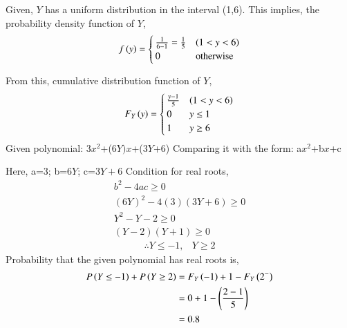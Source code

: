 Given, $Y$ has a uniform distribution in the interval (1,6).  
This implies, the probability density function of $Y$,
\begin{align}
f\brak{y} 
= 
\begin{cases}
\frac{1}{6-1} = \frac{1}{5}           & (1<y<6) \\
0           & $otherwise$ 
\end{cases}
\end{align}
 
From this, cumulative distribution function of $Y$, 
\begin{align}
F_Y\left(y\right) 
= 
\begin{cases}
\frac{y-1}{5}           & (1<y<6) \\
0           & y \leq 1 \\
1           & y \geq 6 \\
\end{cases}
\end{align}
  Given polynomial: 3$x^2$+(6$Y)x$+(3$Y$+6)  Comparing it with the form: a$x^2$+b$x$+c 

Here, a=3; b=$6Y$; c=$3Y+6$
 Condition for real roots,
\begin{align}
    b^2 - 4ac \geq 0\\
    (6Y)^2 - 4(3)(3Y+6) \geq 0 \\
    Y^2-Y-2 \geq 0\\
 (Y-2)(Y+1) \geq 0
 \end{align}
 \begin{align}
\therefore  Y \leq -1, &  Y \geq 2
\end{align}
Probability that the given polynomial has real roots is,
\begin{align}
   P\left(Y \leq -1\right) + P\left(Y \geq 2\right) &= F_Y\left(-1\right) + 
       1 - F_Y\left(2^{-}\right)\\
      &= 0 + 1 - \left(\frac{2-1}{5}\right)\\
    &= 0.8
\end{align}